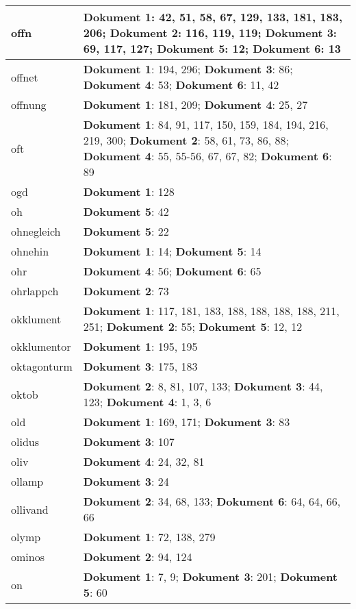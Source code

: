 \documentclass[a5paper]{article}
\begin{document}
\begin{longtable}[l]{|l|p{3in}|}
offn & \textbf{Dokument 1}: 42, 51, 58, 67, 129, 133, 181, 183, 206; \textbf{Dokument 2}: 116, 119, 119; \textbf{Dokument 3}: 69, 117, 127; \textbf{Dokument 5}: 12; \textbf{Dokument 6}: 13 \\
\hline
offnet & \textbf{Dokument 1}: 194, 296; \textbf{Dokument 3}: 86; \textbf{Dokument 4}: 53; \textbf{Dokument 6}: 11, 42 \\
\hline
offnung & \textbf{Dokument 1}: 181, 209; \textbf{Dokument 4}: 25, 27 \\
\hline
oft & \textbf{Dokument 1}: 84, 91, 117, 150, 159, 184, 194, 216, 219, 300; \textbf{Dokument 2}: 58, 61, 73, 86, 88; \textbf{Dokument 4}: 55, 55-56, 67, 67, 82; \textbf{Dokument 6}: 89 \\
\hline
ogd & \textbf{Dokument 1}: 128 \\
\hline
oh & \textbf{Dokument 5}: 42 \\
\hline
ohnegleich & \textbf{Dokument 5}: 22 \\
\hline
ohnehin & \textbf{Dokument 1}: 14; \textbf{Dokument 5}: 14 \\
\hline
ohr & \textbf{Dokument 4}: 56; \textbf{Dokument 6}: 65 \\
\hline
ohrlappch & \textbf{Dokument 2}: 73 \\
\hline
okklument & \textbf{Dokument 1}: 117, 181, 183, 188, 188, 188, 188, 211, 251; \textbf{Dokument 2}: 55; \textbf{Dokument 5}: 12, 12 \\
\hline
okklumentor & \textbf{Dokument 1}: 195, 195 \\
\hline
oktagonturm & \textbf{Dokument 3}: 175, 183 \\
\hline
oktob & \textbf{Dokument 2}: 8, 81, 107, 133; \textbf{Dokument 3}: 44, 123; \textbf{Dokument 4}: 1, 3, 6 \\
\hline
old & \textbf{Dokument 1}: 169, 171; \textbf{Dokument 3}: 83 \\
\hline
olidus & \textbf{Dokument 3}: 107 \\
\hline
oliv & \textbf{Dokument 4}: 24, 32, 81 \\
\hline
ollamp & \textbf{Dokument 3}: 24 \\
\hline
ollivand & \textbf{Dokument 2}: 34, 68, 133; \textbf{Dokument 6}: 64, 64, 66, 66 \\
\hline
olymp & \textbf{Dokument 1}: 72, 138, 279 \\
\hline
ominos & \textbf{Dokument 2}: 94, 124 \\
\hline
on & \textbf{Dokument 1}: 7, 9; \textbf{Dokument 3}: 201; \textbf{Dokument 5}: 60 \\

\end{longtable}
\end{document}
